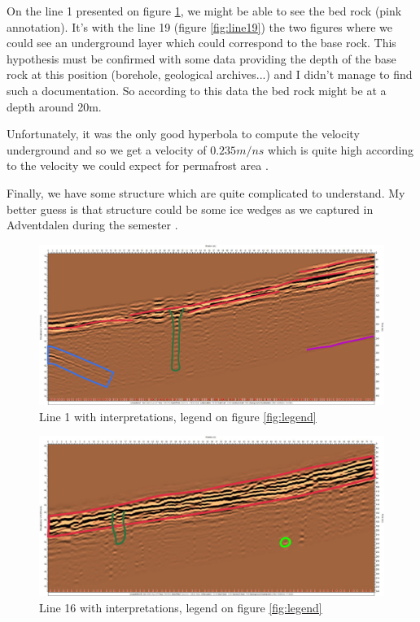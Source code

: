 On the line 1 presented on figure \ref{fig:line1}, we might be able to see the bed rock (pink annotation). It's with the line 19 (figure \ref{fig:line19}) the two figures where we could see an underground layer which could correspond to the base rock. This hypothesis must be confirmed with some data providing the depth of the base rock at this position (borehole, geological archives...) and I didn't manage to find such a documentation. So according to this data the bed rock might be at a depth around 20m.

 
Unfortunately, it was the only good hyperbola to compute the velocity underground and so we get a velocity of $0.235m/ns$ which is quite high according to the velocity we could expect for permafrost area \cite{GPRAnalysis}.

Finally, we have some structure which are quite complicated to understand. My better guess is that structure could be some ice wedges as we captured in Adventdalen during the semester \cite{UNIS211-GPRReport}.

\begin{figure} [p]
    \centering
    \includegraphics[width=\linewidth]{Images/00_Results/line1_edited.jpg}
    \caption{Line 1 with interpretations, legend on figure \ref{fig:legend}}
    \label{fig:line1}
\end{figure}

\begin{figure}[p]
    \centering
    \includegraphics[width=\linewidth]{Images/00_Results/line16_edited.jpg}
    \caption{Line 16 with interpretations, legend on figure \ref{fig:legend}}
    \label{fig:line16}
\end{figure}

